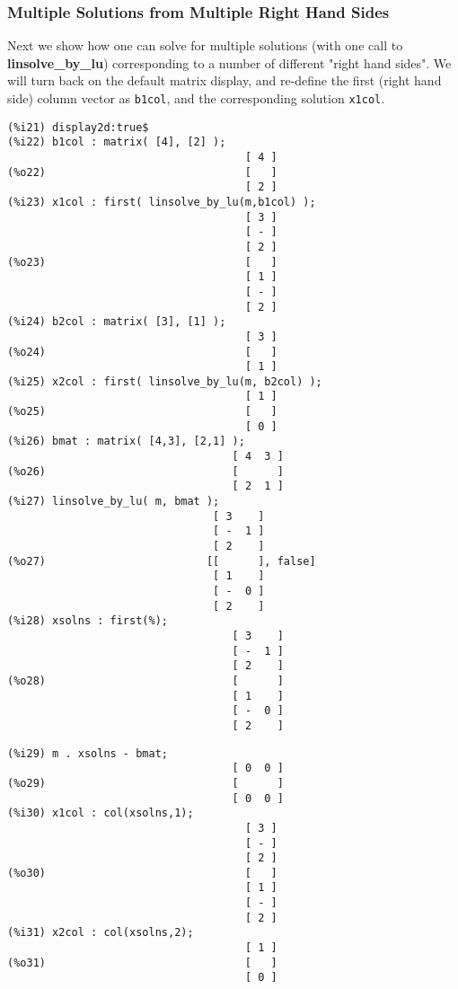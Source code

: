 \documentclass[12pt]{article}
\begin{document}
\subsubsection{Multiple Solutions from Multiple Right Hand Sides}
Next we show how one can solve for multiple solutions (with one call to
  \textbf{linsolve\_by\_lu}) corresponding to a number of different "right hand sides".
We will turn back on the default matrix display, and re-define the first 
  (right hand side) column vector as \verb|b1col|, and the corresponding solution
   \verb|x1col|.
\small
\begin{verbatim}
(%i21) display2d:true$
(%i22) b1col : matrix( [4], [2] );
                                     [ 4 ]
(%o22)                               [   ]
                                     [ 2 ]
(%i23) x1col : first( linsolve_by_lu(m,b1col) );
                                     [ 3 ]
                                     [ - ]
                                     [ 2 ]
(%o23)                               [   ]
                                     [ 1 ]
                                     [ - ]
                                     [ 2 ]
(%i24) b2col : matrix( [3], [1] );
                                     [ 3 ]
(%o24)                               [   ]
                                     [ 1 ]
(%i25) x2col : first( linsolve_by_lu(m, b2col) );
                                     [ 1 ]
(%o25)                               [   ]
                                     [ 0 ]
(%i26) bmat : matrix( [4,3], [2,1] );
                                   [ 4  3 ]
(%o26)                             [      ]
                                   [ 2  1 ]
(%i27) linsolve_by_lu( m, bmat );
                                [ 3    ]
                                [ -  1 ]
                                [ 2    ]
(%o27)                         [[      ], false]
                                [ 1    ]
                                [ -  0 ]
                                [ 2    ]
(%i28) xsolns : first(%);
                                   [ 3    ]
                                   [ -  1 ]
                                   [ 2    ]
(%o28)                             [      ]
                                   [ 1    ]
                                   [ -  0 ]
                                   [ 2    ]
\end{verbatim}
\newpage
\begin{verbatim}
(%i29) m . xsolns - bmat;
                                   [ 0  0 ]
(%o29)                             [      ]
                                   [ 0  0 ]
(%i30) x1col : col(xsolns,1);
                                     [ 3 ]
                                     [ - ]
                                     [ 2 ]
(%o30)                               [   ]
                                     [ 1 ]
                                     [ - ]
                                     [ 2 ]
(%i31) x2col : col(xsolns,2);
                                     [ 1 ]
(%o31)                               [   ]
                                     [ 0 ]
\end{verbatim}
\end{document}
